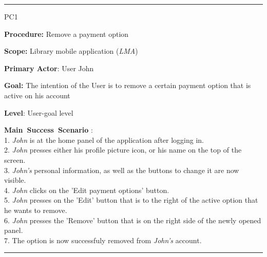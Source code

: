 \vspace{0.5cm}
\hrule
\begin{lyxlist}{PC1}
\small{
\item [\textbf{Procedure:}] Remove a payment option
\item [\textbf{Scope:}] Library mobile application (\emph{LMA})
\item [\textbf{Primary Actor}:] User John
\item [\textbf{Goal:}] The intention of the User is to remove a certain payment
option that is active on his account
\item [\textbf{Level}:] User-goal level
\item [\textbf{Main~Success~Scenario}]:\\
1. \emph{John} is at the home panel of the application after logging in.\\
2. \emph{John} presses either his profile picture icon, or his name on the
top of the screen. \\ 
3. \emph{John's} personal information, as well as the buttons to change it are
now visible.\\
4. \emph{John} clicks on the 'Edit payment options' button.\\
5. \emph{John} presses on the 'Edit' button that is to the right of the
active option that he wants to remove. \\
6. \emph{John} presses the 'Remove' button that is on the right side of the
newly opened panel. \\
7. The option is now successfuly removed from \emph{John's} account. \\

}

\end{lyxlist}
\hrule

